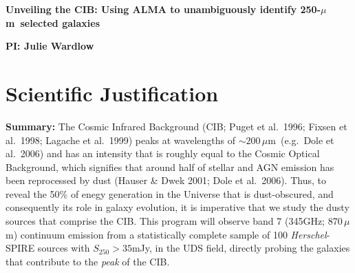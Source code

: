 \documentclass[11pt,a4paper]{article}
\newcommand{\herschel}{{\it Herschel}}
\newcommand{\micron}{$\mu$m}
\begin{document}
\pagestyle{plain}
 

\begin{center}
{\LARGE{\bf
{Unveiling the CIB: Using ALMA to unambiguously identify 250-\micron\
  selected galaxies}
}}
\end{center}

\centerline{\bf PI: 
{Julie Wardlow}}



\section{Scientific Justification}

{\bf Summary: }
%
The Cosmic Infrared Background (CIB; Puget et al.\ 1996; Fixsen et
al.\ 1998; Lagache et al.\ 1999) peaks at wavelengths of
$\sim200$\,\micron\ (e.g.\ Dole et al.\ 2006) and has an intensity that is roughly equal to the
Cosmic Optical Background, which signifies that around half of stellar
and AGN emission has been
reprocessed by dust (Hauser \& Dwek 2001; Dole et al.\ 2006). Thus, to
reveal the 50\% of enegy generation in the Universe that is dust-obscured, and consequently
its role in galaxy evolution, it is imperative that we study the dusty
sources that comprise the CIB.
%
This program will observe band 7 (345GHz; 870\,\micron) continuum
emission  from a statistically complete sample of
100 \herschel-SPIRE sources with $S_{250}>35$mJy, in the UDS field, directly probing the galaxies that
contribute to the {\it peak} of the CIB. 
\end{document}
